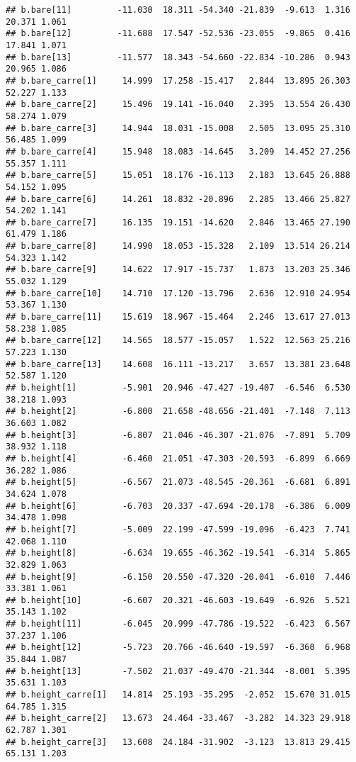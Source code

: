 \documentclass[
]{article}
\begin{document}
\begin{verbatim}
## b.bare[11]         -11.030  18.311 -54.340 -21.839  -9.613  1.316  20.371 1.061
## b.bare[12]         -11.688  17.547 -52.536 -23.055  -9.865  0.416  17.841 1.071
## b.bare[13]         -11.577  18.343 -54.660 -22.834 -10.286  0.943  20.965 1.086
## b.bare_carre[1]     14.999  17.258 -15.417   2.844  13.895 26.303  52.227 1.133
## b.bare_carre[2]     15.496  19.141 -16.040   2.395  13.554 26.430  58.274 1.079
## b.bare_carre[3]     14.944  18.031 -15.008   2.505  13.095 25.310  56.485 1.099
## b.bare_carre[4]     15.948  18.083 -14.645   3.209  14.452 27.256  55.357 1.111
## b.bare_carre[5]     15.051  18.176 -16.113   2.183  13.645 26.888  54.152 1.095
## b.bare_carre[6]     14.261  18.832 -20.896   2.285  13.466 25.827  54.202 1.141
## b.bare_carre[7]     16.135  19.151 -14.620   2.846  13.465 27.190  61.479 1.186
## b.bare_carre[8]     14.990  18.053 -15.328   2.109  13.514 26.214  54.323 1.142
## b.bare_carre[9]     14.622  17.917 -15.737   1.873  13.203 25.346  55.032 1.129
## b.bare_carre[10]    14.710  17.120 -13.796   2.636  12.910 24.954  53.367 1.130
## b.bare_carre[11]    15.619  18.967 -15.464   2.246  13.617 27.013  58.238 1.085
## b.bare_carre[12]    14.565  18.577 -15.057   1.522  12.563 25.216  57.223 1.130
## b.bare_carre[13]    14.608  16.111 -13.217   3.657  13.381 23.648  52.587 1.120
## b.height[1]         -5.901  20.946 -47.427 -19.407  -6.546  6.530  38.218 1.093
## b.height[2]         -6.800  21.658 -48.656 -21.401  -7.148  7.113  36.603 1.082
## b.height[3]         -6.807  21.046 -46.307 -21.076  -7.891  5.709  38.932 1.118
## b.height[4]         -6.460  21.051 -47.303 -20.593  -6.899  6.669  36.282 1.086
## b.height[5]         -6.567  21.073 -48.545 -20.361  -6.681  6.891  34.624 1.078
## b.height[6]         -6.703  20.337 -47.694 -20.178  -6.386  6.009  34.478 1.098
## b.height[7]         -5.009  22.199 -47.599 -19.096  -6.423  7.741  42.068 1.110
## b.height[8]         -6.634  19.655 -46.362 -19.541  -6.314  5.865  32.829 1.063
## b.height[9]         -6.150  20.550 -47.320 -20.041  -6.010  7.446  33.381 1.061
## b.height[10]        -6.607  20.321 -46.603 -19.649  -6.926  5.521  35.143 1.102
## b.height[11]        -6.045  20.999 -47.786 -19.522  -6.423  6.567  37.237 1.106
## b.height[12]        -5.723  20.766 -46.640 -19.597  -6.360  6.968  35.844 1.087
## b.height[13]        -7.502  21.037 -49.470 -21.344  -8.001  5.395  35.631 1.103
## b.height_carre[1]   14.814  25.193 -35.295  -2.052  15.670 31.015  64.785 1.315
## b.height_carre[2]   13.673  24.464 -33.467  -3.282  14.323 29.918  62.787 1.301
## b.height_carre[3]   13.608  24.184 -31.902  -3.123  13.813 29.415  65.131 1.203

\end{verbatim}
\end{document}
